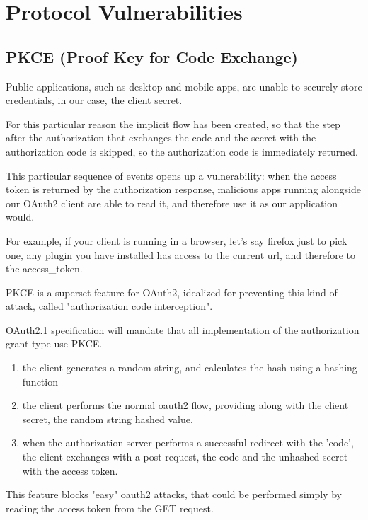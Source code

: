 \documentclass[11pt]{style}
\begin{document}
\section{Protocol Vulnerabilities}
\subsection{PKCE (Proof Key for Code Exchange)}
\label{pkce}
Public applications, such as desktop and mobile apps, are unable to securely
store credentials, in our case, the client secret.

For this particular reason the implicit flow has been created, so
that the step after the authorization that exchanges the code and the secret
with the authorization code is skipped, so the authorization code is immediately
returned.

This particular sequence of events opens up a vulnerability:
when the access token is returned by the authorization response, malicious apps
running alongside our OAuth2 client are able to read it, and therefore use it as
our application would.

For example, if your client is running in a browser, let's say firefox just to
pick one, any plugin you have installed has access to the current url, and
therefore to the access\_token.

PKCE is a superset feature for OAuth2, idealized for preventing this kind of
attack, called "authorization code interception".

OAuth2.1 specification will mandate that all implementation of the authorization
grant type use PKCE.

\begin{enumerate}
    \item the client generates a random string, and calculates the hash using a
        hashing function
    \item the client performs the normal oauth2 flow, providing along with the
        client secret, the random string hashed value.
    \item when the authorization server performs a successful redirect with the
        'code', the client exchanges with a post request, the code and the
        unhashed secret with the access token.
\end{enumerate}

This feature blocks "easy" oauth2 attacks, that could be performed simply by
reading the access token from the GET request.
\end{document}
